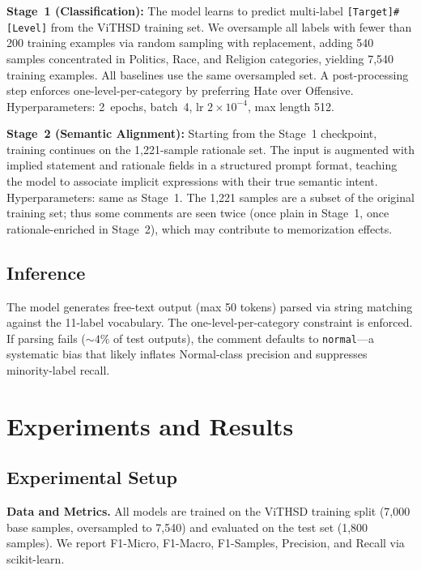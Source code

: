 \documentclass[conference]{IEEEtran}
\begin{document}
\textbf{Stage~1 (Classification):} The model learns to predict multi-label
\texttt{[Target]\#[Level]} from the ViTHSD training set. We oversample all
labels with fewer than 200 training examples via random sampling with
replacement, adding 540 samples concentrated in Politics, Race, and Religion
categories, yielding 7,540 training examples. All baselines use the same
oversampled set. A post-processing step enforces one-level-per-category by
preferring Hate over Offensive. Hyperparameters: 2~epochs, batch~4, lr
$2{\times}10^{-4}$, max length 512.

\textbf{Stage~2 (Semantic Alignment):} Starting from the Stage~1 checkpoint,
training continues on the 1,221-sample rationale set. The input is augmented with
implied statement and rationale fields in a structured prompt format, teaching the
model to associate implicit expressions with their true semantic intent.
Hyperparameters: same as Stage~1. The 1,221 samples are a subset of the original
training set; thus some comments are seen twice (once plain in Stage~1, once
rationale-enriched in Stage~2), which may contribute to memorization effects.

\subsection{Inference}

The model generates free-text output (max 50 tokens) parsed via string matching
against the 11-label vocabulary. The one-level-per-category constraint is
enforced. If parsing fails (${\sim}4\%$ of test outputs), the comment defaults to
\texttt{normal}---a systematic bias that likely inflates Normal-class precision
and suppresses minority-label recall.


\section{Experiments and Results}\label{sec:results}

\subsection{Experimental Setup}

\textbf{Data and Metrics.} All models are trained on the ViTHSD training split
(7,000 base samples, oversampled to 7,540) and evaluated on the test set (1,800
samples). We report F1-Micro, F1-Macro, F1-Samples, Precision, and Recall via
scikit-learn.
\end{document}
